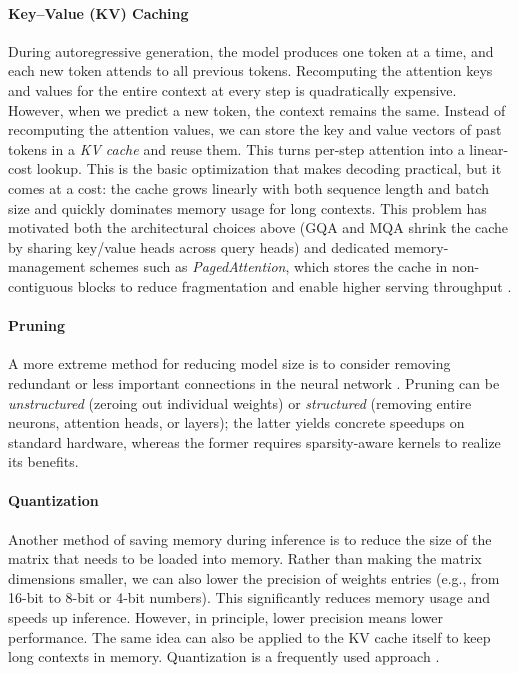 \paragraph{Key--Value (KV) Caching} During autoregressive generation, the model produces one token at a time, and each new token attends to all previous tokens. Recomputing the attention keys and values for the entire context at every step is quadratically expensive. However, when we predict a new token, the context remains the same. Instead of recomputing the attention values, we can store the key and value vectors of past tokens in a \emph{KV cache} and reuse them. This turns per-step attention into a linear-cost lookup. This is the basic optimization that makes decoding practical, but it comes at a cost: the cache grows linearly with both sequence length and batch size and quickly dominates memory usage for long contexts. This problem has motivated both the architectural choices above (GQA and MQA shrink the cache by sharing key/value heads across query heads) and dedicated memory-management schemes such as \emph{PagedAttention}, which stores the cache in non-contiguous blocks to reduce fragmentation and enable higher serving throughput \citep{kwon2023efficient}.

\paragraph{Pruning} A more extreme method for reducing model size is to consider removing redundant or less important connections in the neural network  \citep{ma2023llm}. Pruning can be \emph{unstructured} (zeroing out individual weights) or \emph{structured} (removing entire neurons, attention heads, or layers); the latter yields concrete speedups on standard hardware, whereas the former requires sparsity-aware kernels to realize its benefits.

\paragraph{Quantization} Another method of saving memory during inference is to reduce the size of the matrix that needs to be loaded into memory. Rather than making the matrix dimensions smaller, we can also lower the precision of weights entries (e.g., from 16-bit to 8-bit or 4-bit numbers). This significantly reduces memory usage and speeds up inference. However,  in principle, lower precision means lower performance. The same idea can also be applied to the KV cache itself to keep long contexts in memory. Quantization is a frequently used approach \citep{dettmers2022gpt3, dettmers2023case, xiao2023smoothquant}. 

